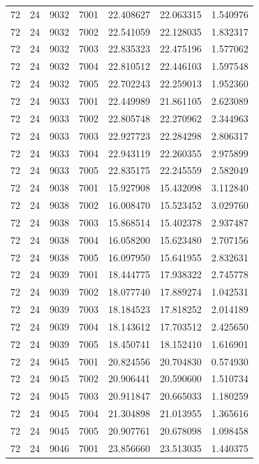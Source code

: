 \begin{table}
\begin{tabular}{rrrrrrr}
72 & 24 & 9032 & 7001 & 22.408627 & 22.063315 & 1.540976 \\
72 & 24 & 9032 & 7002 & 22.541059 & 22.128035 & 1.832317 \\
72 & 24 & 9032 & 7003 & 22.835323 & 22.475196 & 1.577062 \\
72 & 24 & 9032 & 7004 & 22.810512 & 22.446103 & 1.597548 \\
72 & 24 & 9032 & 7005 & 22.702243 & 22.259013 & 1.952360 \\
72 & 24 & 9033 & 7001 & 22.449989 & 21.861105 & 2.623089 \\
72 & 24 & 9033 & 7002 & 22.805748 & 22.270962 & 2.344963 \\
72 & 24 & 9033 & 7003 & 22.927723 & 22.284298 & 2.806317 \\
72 & 24 & 9033 & 7004 & 22.943119 & 22.260355 & 2.975899 \\
72 & 24 & 9033 & 7005 & 22.835175 & 22.245559 & 2.582049 \\
72 & 24 & 9038 & 7001 & 15.927908 & 15.432098 & 3.112840 \\
72 & 24 & 9038 & 7002 & 16.008470 & 15.523452 & 3.029760 \\
72 & 24 & 9038 & 7003 & 15.868514 & 15.402378 & 2.937487 \\
72 & 24 & 9038 & 7004 & 16.058200 & 15.623480 & 2.707156 \\
72 & 24 & 9038 & 7005 & 16.097950 & 15.641955 & 2.832631 \\
72 & 24 & 9039 & 7001 & 18.444775 & 17.938322 & 2.745778 \\
72 & 24 & 9039 & 7002 & 18.077740 & 17.889274 & 1.042531 \\
72 & 24 & 9039 & 7003 & 18.184523 & 17.818252 & 2.014189 \\
72 & 24 & 9039 & 7004 & 18.143612 & 17.703512 & 2.425650 \\
72 & 24 & 9039 & 7005 & 18.450741 & 18.152410 & 1.616901 \\
72 & 24 & 9045 & 7001 & 20.824556 & 20.704830 & 0.574930 \\
72 & 24 & 9045 & 7002 & 20.906441 & 20.590600 & 1.510734 \\
72 & 24 & 9045 & 7003 & 20.911847 & 20.665033 & 1.180259 \\
72 & 24 & 9045 & 7004 & 21.304898 & 21.013955 & 1.365616 \\
72 & 24 & 9045 & 7005 & 20.907761 & 20.678098 & 1.098458 \\
72 & 24 & 9046 & 7001 & 23.856660 & 23.513035 & 1.440375 \\

\end{tabular}
\end{table}
